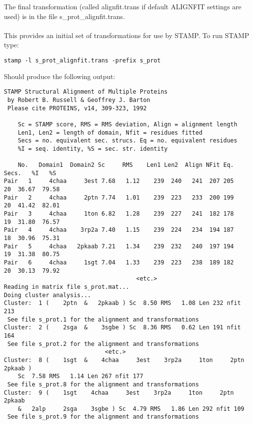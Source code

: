 The final transformation 
(called alignfit.trans if default ALIGNFIT settings are used) is
in the file s\_prot\_alignfit.trans.\\
\\
This provides an initial set of transformations for use by
STAMP.  To run STAMP type:

\begin{scriptsize}\begin{verbatim}
stamp -l s_prot_alignfit.trans -prefix s_prot 
\end{verbatim} \end{scriptsize}

Should produce the following output:\\
\begin{scriptsize}\begin{verbatim}
STAMP Structural Alignment of Multiple Proteins
 by Robert B. Russell & Geoffrey J. Barton 
 Please cite PROTEINS, v14, 309-323, 1992

    Sc = STAMP score, RMS = RMS deviation, Align = alignment length
    Len1, Len2 = length of domain, Nfit = residues fitted
    Secs = no. equivalent sec. strucs. Eq = no. equivalent residues
    %I = seq. identity, %S = sec. str. identity

    No.   Domain1  Domain2 Sc     RMS    Len1 Len2  Align NFit Eq. Secs.   %I   %S 
Pair   1     4chaa     3est 7.68   1.12    239  240   241  207 205   20  36.67  79.58
Pair   2     4chaa     2ptn 7.74   1.01    239  223   233  200 199   20  41.42  82.01
Pair   3     4chaa     1ton 6.82   1.28    239  227   241  182 178   19  31.80  76.57
Pair   4     4chaa    3rp2a 7.40   1.15    239  224   234  194 187   18  30.96  75.31
Pair   5     4chaa   2pkaab 7.21   1.34    239  232   240  197 194   19  31.38  80.75
Pair   6     4chaa     1sgt 7.04   1.33    239  223   238  189 182   20  30.13  79.92
                                      <etc.>
Reading in matrix file s_prot.mat...
Doing cluster analysis...
Cluster:  1 (    2ptn  &   2pkaab ) Sc  8.50 RMS   1.08 Len 232 nfit 213 
 See file s_prot.1 for the alignment and transformations
Cluster:  2 (    2sga  &    3sgbe ) Sc  8.36 RMS   0.62 Len 191 nfit 164 
 See file s_prot.2 for the alignment and transformations
                             <etc.>    
Cluster:  8 (    1sgt  &    4chaa     3est    3rp2a     1ton     2ptn   2pkaab ) 
	Sc  7.58 RMS   1.14 Len 267 nfit 177 
 See file s_prot.8 for the alignment and transformations
Cluster:  9 (    1sgt    4chaa     3est    3rp2a     1ton     2ptn   2pkaab  
	&   2alp     2sga    3sgbe ) Sc  4.79 RMS   1.86 Len 292 nfit 109 
 See file s_prot.9 for the alignment and transformations
\end{verbatim} \end{scriptsize}

